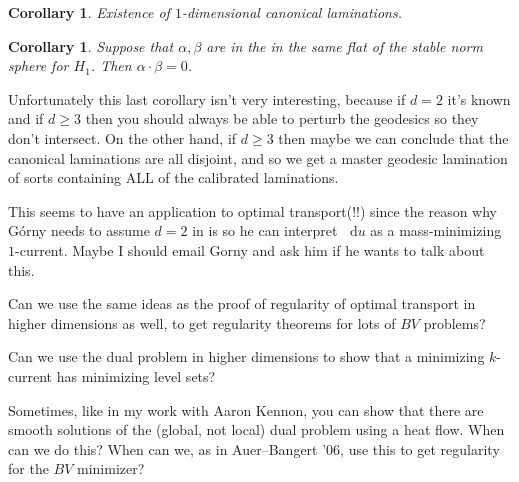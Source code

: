 \documentclass[reqno,11pt]{amsart}
\newcommand*\dif{\mathop{}\!\mathrm{d}}
\newtheorem{corollary}[theorem]{Corollary}
\theoremstyle{definition}
\numberwithin{equation}{section}
\begin{document}
\begin{corollary}
Existence of $1$-dimensional canonical laminations.
\end{corollary}

\begin{corollary}
Suppose that $\alpha, \beta$ are in the in the same flat of the stable norm sphere for $H_1$.
Then $\alpha \cdot \beta = 0$.
\end{corollary}

Unfortunately this last corollary isn't very interesting, because if $d = 2$ it's known and if $d \geq 3$ then you should always be able to perturb the geodesics so they don't intersect.
On the other hand, if $d \geq 3$ then maybe we can conclude that the canonical laminations are all disjoint, and so we get a master geodesic lamination of sorts containing ALL of the calibrated laminations.

This seems to have an application to optimal transport(!!) since the reason why G\'orny needs to assume $d = 2$ in \cite{górny2021applications} is so he can interpret $\dif u$ as a mass-minimizing $1$-current.
Maybe I should email Gorny and ask him if he wants to talk about this.

Can we use the same ideas as the proof of regularity of optimal transport in higher dimensions as well, to get regularity theorems for lots of $BV$ problems?

Can we use the dual problem in higher dimensions to show that a minimizing $k$-current has minimizing level sets?

Sometimes, like in my work with Aaron Kennon, you can show that there are smooth solutions of the (global, not local) dual problem using a heat flow.
When can we do this?
When can we, as in Auer--Bangert '06, use this to get regularity for the $BV$ minimizer?

\printbibliography
\end{document}
